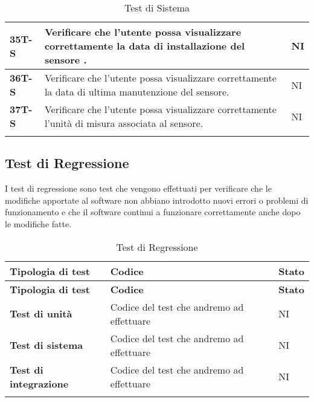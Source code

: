 \begin{longtable}{|>{\raggedright\arraybackslash}m{}|>{\raggedright\arraybackslash}m{}|>{\raggedright\arraybackslash}m{}|}
	\hline
	\textbf{35T-S}   & Verificare che l’utente possa visualizzare correttamente la data di installazione del sensore . & NI\\
	\hline
	\textbf{36T-S}   & Verificare che l’utente possa visualizzare correttamente la data di ultima manutenzione del sensore. & NI\\
	\hline
	\textbf{37T-S}   & Verificare che l’utente possa visualizzare correttamente l’unità di misura associata al sensore. & NI\\
	\hline
	\caption{Test di Sistema} %
	\label{table:14}
\end{longtable}

\subsection{Test di Regressione}
I test di regressione sono test che vengono effettuati per verificare che le modifiche apportate al software non abbiano introdotto nuovi errori o problemi di funzionamento e che il software continui a funzionare correttamente anche dopo le modifiche fatte. \\
\begin{longtable}{|>{\raggedright\arraybackslash}m{}|>{\raggedright\arraybackslash}m{}|>{\raggedright\arraybackslash}m{}|}
	\hline
	\textbf{Tipologia di test} & \textbf{Codice} & \textbf{Stato} \\
	\hline
	\endfirsthead
	\hline
	\textbf{Tipologia di test} & \textbf{Codice} & \textbf{Stato} \\
	\endhead
	\textbf{Test di unità}   		& Codice del test che andremo ad effettuare     & NI\\
	\hline
	\textbf{Test di sistema}  		& Codice del test che andremo ad effettuare     & NI\\
	\hline
	\textbf{Test di integrazione}   & Codice del test che andremo ad effettuare     & NI\\
	\hline
	\caption{Test di Regressione} %
	\label{table:15}
\end{longtable}
\newpage
